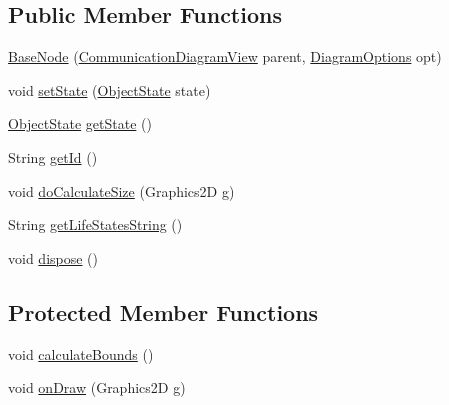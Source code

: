\subsection*{Public Member Functions}
\begin{DoxyCompactItemize}
\item 
\hyperlink{classorg_1_1tzi_1_1use_1_1gui_1_1views_1_1diagrams_1_1behavior_1_1communicationdiagram_1_1_base_node_a2e7cdf612e148b353efd75ef01d7c998}{Base\-Node} (\hyperlink{classorg_1_1tzi_1_1use_1_1gui_1_1views_1_1diagrams_1_1behavior_1_1communicationdiagram_1_1_communication_diagram_view}{Communication\-Diagram\-View} parent, \hyperlink{classorg_1_1tzi_1_1use_1_1gui_1_1views_1_1diagrams_1_1_diagram_options}{Diagram\-Options} opt)
\item 
void \hyperlink{classorg_1_1tzi_1_1use_1_1gui_1_1views_1_1diagrams_1_1behavior_1_1communicationdiagram_1_1_base_node_a941d7fe61bf9a6c783bcabcc315cdd2c}{set\-State} (\hyperlink{enumorg_1_1tzi_1_1use_1_1gui_1_1views_1_1diagrams_1_1behavior_1_1communicationdiagram_1_1_object_state}{Object\-State} state)
\item 
\hyperlink{enumorg_1_1tzi_1_1use_1_1gui_1_1views_1_1diagrams_1_1behavior_1_1communicationdiagram_1_1_object_state}{Object\-State} \hyperlink{classorg_1_1tzi_1_1use_1_1gui_1_1views_1_1diagrams_1_1behavior_1_1communicationdiagram_1_1_base_node_a210860a4a57a3e860024ea51ddadb140}{get\-State} ()
\item 
String \hyperlink{classorg_1_1tzi_1_1use_1_1gui_1_1views_1_1diagrams_1_1behavior_1_1communicationdiagram_1_1_base_node_a8bcc0727fb782d0bcd772a48472cb840}{get\-Id} ()
\item 
void \hyperlink{classorg_1_1tzi_1_1use_1_1gui_1_1views_1_1diagrams_1_1behavior_1_1communicationdiagram_1_1_base_node_a2aa544ecb1a23b71c663723fed4d1c9b}{do\-Calculate\-Size} (Graphics2\-D g)
\item 
String \hyperlink{classorg_1_1tzi_1_1use_1_1gui_1_1views_1_1diagrams_1_1behavior_1_1communicationdiagram_1_1_base_node_aee19fe525e6579e20734489b78b8c6e4}{get\-Life\-States\-String} ()
\item 
void \hyperlink{classorg_1_1tzi_1_1use_1_1gui_1_1views_1_1diagrams_1_1behavior_1_1communicationdiagram_1_1_base_node_a64551ddfd5e37b500dac4f5f4ba84843}{dispose} ()
\end{DoxyCompactItemize}
\subsection*{Protected Member Functions}
\begin{DoxyCompactItemize}
\item 
void \hyperlink{classorg_1_1tzi_1_1use_1_1gui_1_1views_1_1diagrams_1_1behavior_1_1communicationdiagram_1_1_base_node_aa3b2dbf3e55626088b15562aa3c21313}{calculate\-Bounds} ()
\item 
void \hyperlink{classorg_1_1tzi_1_1use_1_1gui_1_1views_1_1diagrams_1_1behavior_1_1communicationdiagram_1_1_base_node_a2f00edc4b8c81c2302f64e71142c0083}{on\-Draw} (Graphics2\-D g)
\end{DoxyCompactItemize}

